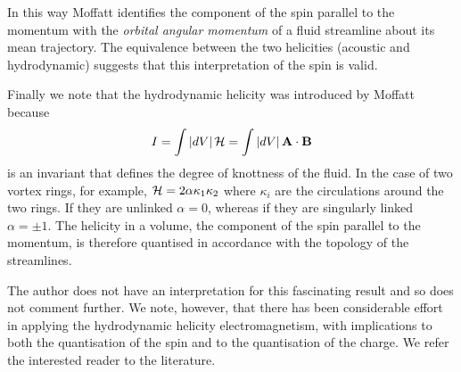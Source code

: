 \documentclass[10pt, fleqn,final,showtrims,oldfontcommands]{article} %
\newcommand{\abs}[1]{\left| #1 \right|}
\newcommand{\vB}{\vect B}
\renewcommand{\H}{{\cal H}}
\newcommand{\vect}[1]{\mathbf{#1}}
\newcommand{\vu}{\textbf{u}}
\newcommand{\vA}{\textbf{A}}
\begin{document}
In this way Moffatt identifies the component of the spin parallel to the momentum
with the {\em orbital angular momentum} of a fluid streamline about its mean trajectory.
The equivalence between the two helicities (acoustic and hydrodynamic)
suggests that this interpretation of the spin is valid.

Finally we note that the hydrodynamic helicity was introduced by Moffatt because 
\begin{align}
  I = \int \abs{dV} \H = \int \abs{dV} \vA \cdot \vB
\end{align}
is an invariant that defines the degree of knottness of the fluid.
In the case of two vortex rings, for example, $\H =2 \alpha \kappa_1 \kappa_2$ 
where $\kappa_i$ are the circulations around the two rings. %
If they are unlinked $\alpha = 0$, whereas if they are singularly linked $\alpha = \pm 1$.
The helicity in a volume, the component of the spin parallel to the momentum, is therefore quantised
in accordance with the topology of the streamlines.

The author does not have an interpretation for this fascinating result and so does not comment further.
We note, however, that there has been considerable effort in applying the hydrodynamic helicity electromagnetism,
with implications to both the quantisation of the spin and to the quantisation of the charge.
We refer the interested reader to the literature\cite{Trueba1996, Trueba2000, Ranada2002}.




\end{document}
